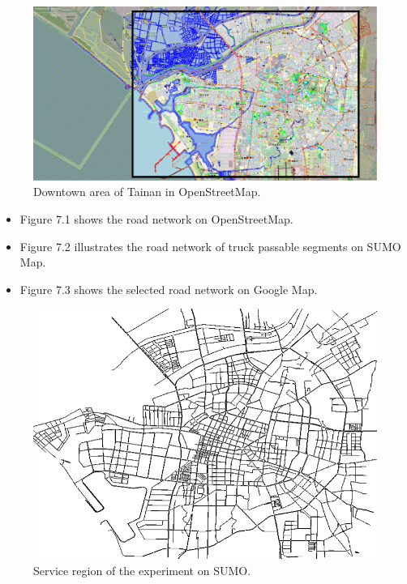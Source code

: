 \documentclass[12pt]{ksthesis}
\begin{document}
\begin{thesis}
{\begin{figure}[H]
\centering
\includegraphics[width=1.0\textwidth]{./Thesis_figures/F7-1_Openstreetmap.PNG}
\caption{\large Downtown area of Tainan in OpenStreetMap.}
\vspace{0.5cm}
\label{Fig:DowntownArea_in_OpenStreetMap.}
\end{figure}


\begin{itemize}
\item
Figure 7.1 shows the road network on OpenStreetMap.

\item
Figure 7.2 illustrates the road network of truck passable segments on SUMO Map.

\item
Figure 7.3 shows the selected road network on Google Map.

\end{itemize}

\begin{figure}[H]
\centering
\includegraphics[width=1.0\textwidth]{./Thesis_figures/F7-2_SUMOMap.PNG}
\caption{\large  Service region of the experiment on SUMO.}
\vspace{0.5cm}
\label{Fig:SUMOMap}
\end{figure}

}
\end{thesis}
\end{document}
